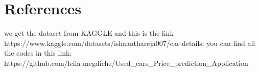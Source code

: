\documentclass{article}
\begin{document}
\section{References}
we get the dataset from KAGGLE and this is the link \\ https://www.kaggle.com/datasets/ishaanthareja007/car-details.
you can find all the codes in this link:\\
https://github.com/leila-megdiche/Used\_cars\_Price\_prediction\_Application
\end{document}
